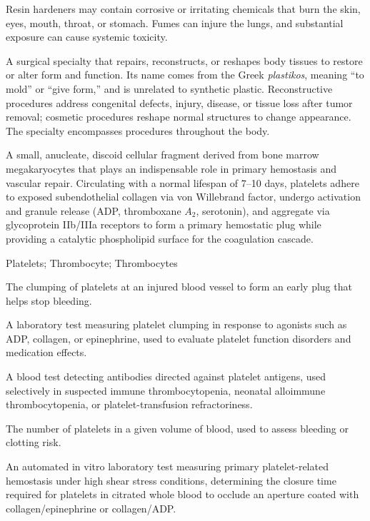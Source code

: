  Resin hardeners may contain corrosive or irritating chemicals that burn the skin, eyes, mouth, throat, or stomach. Fumes can injure the lungs, and substantial exposure can cause systemic toxicity.

 A surgical specialty that repairs, reconstructs, or reshapes body tissues to restore or alter form and function. Its name comes from the Greek \textit{plastikos}, meaning “to mold” or “give form,” and is unrelated to synthetic plastic. Reconstructive procedures address congenital defects, injury, disease, or tissue loss after tumor removal; cosmetic procedures reshape normal structures to change appearance. The specialty encompasses procedures throughout the body.

 A small, anucleate, discoid cellular fragment derived from bone marrow megakaryocytes that plays an indispensable role in primary hemostasis and vascular repair. Circulating with a normal lifespan of 7--10 days, platelets adhere to exposed subendothelial collagen via von Willebrand factor, undergo activation and granule release (ADP, thromboxane $A_2$, serotonin), and aggregate via glycoprotein IIb/IIIa receptors to form a primary hemostatic plug while providing a catalytic phospholipid surface for the coagulation cascade.

\synonyms
Platelets; Thrombocyte; Thrombocytes

 The clumping of platelets at an injured blood vessel to form an early plug that helps stop bleeding.

 A laboratory test measuring platelet clumping in response to agonists such as ADP, collagen, or epinephrine, used to evaluate platelet function disorders and medication effects.

 A blood test detecting antibodies directed against platelet antigens, used selectively in suspected immune thrombocytopenia, neonatal alloimmune thrombocytopenia, or platelet-transfusion refractoriness.

 The number of platelets in a given volume of blood, used to assess bleeding or clotting risk.

 An automated in vitro laboratory test measuring primary platelet-related hemostasis under high shear stress conditions, determining the closure time required for platelets in citrated whole blood to occlude an aperture coated with collagen/epinephrine or collagen/ADP.

